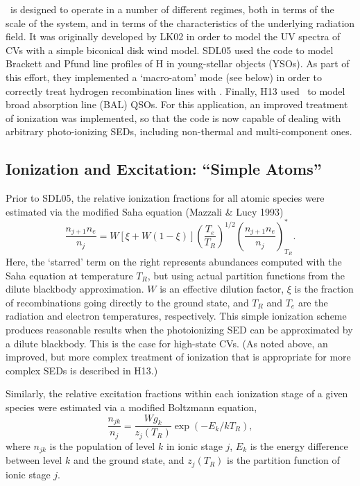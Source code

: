 \documentclass[preprint, a4paper, 11pt]{aastex}
\begin{document}
\py\ is designed to operate in a number of different
regimes, both in terms of the scale of the system, and in terms of the
characteristics of the underlying radiation field.
It was originally developed by LK02 in order to model the UV spectra
of CVs with a simple biconical disk wind model. SDL05
\nocite{simmacro2005} used the code to model Brackett
and Pfund line profiles of H in young-stellar objects (YSOs). As part
of this effort, they implemented a `macro-atom' mode (see below) in
order to correctly treat hydrogen recombination lines with
\py. Finally, H13 used \py\ to model broad absorption line (BAL) QSOs. For
this application, an improved treatment of ionization was implemented,
so that the code is now capable of dealing with arbitrary
photo-ionizing SEDs, including non-thermal and multi-component ones. 

\subsection{Ionization and Excitation: ``Simple Atoms''}
\label{simpleatoms}

Prior to SDL05, the relative ionization fractions for all atomic
species were estimated via the modified Saha equation (Mazzali \&
Lucy 1993)  
\begin{equation}
\frac{n_{j+1} n_e}{n_j} = W [\xi + W(1-\xi)]
\left(\frac{T_e}{T_R}\right)^{1/2}
\left(\frac{n_{j+1}n_e}{n_j}\right)^*_{T_R}. \label{ionization}
\end{equation}
Here, the `starred' term on the right represents abundances computed with
the Saha equation at temperature $T_R$, but using actual partition functions
from the dilute blackbody approximation. 
$W$ is an effective dilution factor, $\xi$ is the
fraction of recombinations going directly to the ground state, and
$T_R$ and $T_e$ are the radiation and electron temperatures,
respectively. This simple ionization scheme produces reasonable
results when the photoionizing SED can be approximated by a dilute
blackbody. This is the case for high-state CVs. (As noted above, an
improved, but more complex treatment of ionization that is appropriate
for more complex SEDs is described in H13.) 

Similarly, the relative excitation fractions within each ionization
stage of a given species were estimated via a modified Boltzmann
equation,
\begin{equation}
\frac{n_{jk}}{n_j} = \frac{W g_k}{z_j(T_R)} \exp(-E_k/kT_R),
\end{equation}
where $n_{jk}$ is the population of level $k$ in ionic stage $j$,
$E_k$ is the energy difference between level $k$ and the ground state,
and $z_j(T_R)$ is the partition function of ionic stage $j$. 
\end{document}
